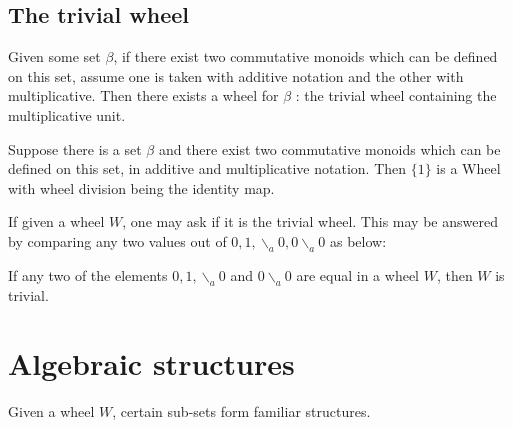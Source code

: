 \subsection{The trivial wheel}
Given some set $\beta$, if there exist two commutative monoids which can be defined on this set, assume one is taken
with additive notation and the other with multiplicative. Then there exists 
a wheel for $\beta$ : the trivial wheel containing the multiplicative unit.
\begin{proposition}
  \leanok
  Suppose there is a set $\beta$ and there exist two commutative monoids which can be defined on this set, in additive
  and multiplicative notation. Then $\{ 1 \}$ is a Wheel with wheel division being the identity map.
\end{proposition}
If given a wheel $W$, one may ask if it is the trivial wheel. This may be answered by comparing any two values out of
$0,1,\backslash_{a} 0, 0 \backslash_{a} 0$ as below:
\begin{proposition}
\leanok
  If any two of the elements $0,1,\backslash_{a} 0$ and $0 \backslash_{a} 0$ are equal in a
wheel $W$, then $W$ is trivial.
\end{proposition} 
\section{Algebraic structures} 
Given a wheel $W$, certain sub-sets form familiar structures. 
